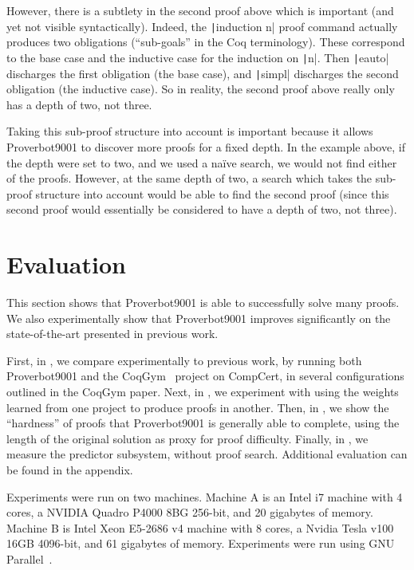 \documentclass[sigplan,screen]{acmart}
\newcommand{\name}{Proverbot9001\xspace}
\newcommand{\coqinline}[1]{\texttt|#1|}
\renewcommand{\>}{\quad}
\begin{document}
However, there is a subtlety in the second proof above which is important (and yet not visible syntactically).
Indeed, the \coqinline{induction n} proof command actually produces two obligations (``sub-goals'' in the Coq terminology).
These correspond to the base case and the inductive case for the induction on \coqinline{n}.
Then \coqinline{eauto} discharges the first obligation (the base case), and \coqinline{simpl} discharges the second obligation (the inductive case).
So in reality, the second proof above really only has a depth of two, not three.

Taking this sub-proof structure into account is important because it allows \name{} to discover more proofs for a fixed depth.
In the example above, if the depth were set to two, and we used a na\"ive search, we would not find either of the proofs.
However, at the same depth of two, a search which takes the sub-proof structure into account would be able to find the second proof (since this second proof would essentially be considered to have a depth of two, not three).













 \section{Evaluation}
\label{sec:evaluation}

This section shows that \name{} is able to successfully solve many proofs.
We also experimentally show that \name{} improves significantly
  on the state-of-the-art presented in previous work.

First, in , we compare experimentally to previous work,
  by running both \name{} and the CoqGym~\cite{coqgym} project on CompCert,
  in several configurations outlined in the CoqGym paper.
Next, in ,
  we experiment with using the weights learned from one project
  to produce proofs in another.
Then, in ,
  we show the ``hardness'' of proofs that Proverbot9001 is generally able to complete,
  using the length of the original solution as proxy for proof difficulty.
Finally, in , we measure the predictor subsystem, without proof search.
Additional evaluation can be found in the appendix.


Experiments were run on two machines.
Machine A is an Intel i7 machine with 4 cores,
  a NVIDIA Quadro P4000 8BG 256-bit,
  and 20 gigabytes of memory.
Machine B is Intel Xeon E5-2686 v4 machine with 8 cores,
  a Nvidia Tesla v100 16GB 4096-bit,
  and 61 gigabytes of memory.
Experiments were run using GNU Parallel~\cite{gnu-parallel}.
\end{document}
